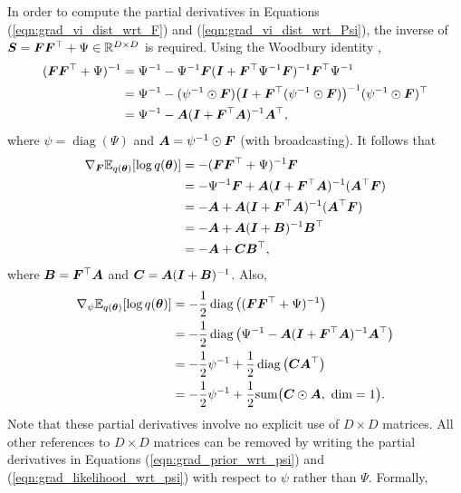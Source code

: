 \documentclass[10pt]{article} %
\newcommand{\diag}{\mathop{\mathrm{diag}}}
\begin{document}
In order to compute the partial derivatives in Equations (\ref{eqn:grad_vi_dist_wrt_F}) and (\ref{eqn:grad_vi_dist_wrt_Psi}), the inverse of ${\bm{S}} = {\bm{F}} {\bm{F}}^{\top} + \Psi \in \mathbb{R}^{D \times D}$ is required. Using the Woodbury identity \cite{petersen2012},
\begin{align}
\begin{split}
	( {\bm{F}} {\bm{F}}^{\top} + \Psi)^{-1}
	& = \Psi^{-1} - \Psi^{-1}{\bm{F}}({\bm{I}} + {\bm{F}}^\top \Psi^{-1} {\bm{F}})^{-1} {\bm{F}}^\top \Psi^{-1} \\
	& = \Psi^{-1} - (\psi^{-1} \odot {\bm{F}}) \big({\bm{I}} + {\bm{F}}^\top (\psi^{-1} \odot {\bm{F}})\big)^{-1} (\psi^{-1} \odot {\bm{F}})^\top \\
	& = \Psi^{-1} - {\bm{A}} ({\bm{I}} + {\bm{F}}^\top {\bm{A}})^{-1} {\bm{A}}^\top,
\end{split}
\end{align}
where $\psi = \diag(\Psi)$ and ${\bm{A}} = \psi^{-1} \odot {\bm{F}}$ (with broadcasting). It follows that
\begin{align}
\begin{split}
	\nabla_{\bm{F}} \mathbb{E}_{q({\bm{\theta}})} [\log q({\bm{\theta}})]
	& = -( {\bm{F}} {\bm{F}}^{\top} + \Psi)^{-1}{\bm{F}} \\
	& = -\Psi^{-1} {\bm{F}}  + {\bm{A}}  ({\bm{I}} + {\bm{F}}^\top {\bm{A}})^{-1} ({\bm{A}}^\top {\bm{F}}) \\
	& = -{\bm{A}}  + {\bm{A}} ({\bm{I}} + {\bm{F}}^\top {\bm{A}})^{-1} ({\bm{A}}^\top {\bm{F}}) \\
	& = -{\bm{A}}  + {\bm{A}} ({\bm{I}} + {\bm{B}})^{-1} {\bm{B}}^\top \\
	& = -{\bm{A}}  + {\bm{C}} {\bm{B}}^\top,
\end{split}
\end{align}
where ${\bm{B}} = {\bm{F}}^\top {\bm{A}}$ and ${\bm{C}} = {\bm{A}} ({\bm{I}} + {\bm{B}})^{-1}$. Also,
\begin{align}
\begin{split}
	\nabla_\psi \E_{q(\vtheta)} [\log q(\vtheta)]
	& = -\frac{1}{2} \diag\big( ( \mF \mF^{\top} + \Psi)^{-1}\big) \\
	& = -\frac{1}{2}\diag\big(\Psi^{-1}  - \mA  (\mI + \mF^\top \mA)^{-1} \mA^\top \big) \\
	& = -\frac{1}{2}\psi^{-1} + \frac{1}{2} \diag\big(\mC \mA^\top \big) \\
	& = -\frac{1}{2}\psi^{-1} + \frac{1}{2} \text{sum}\big(\mC \odot \mA, \text{ dim} = 1\big).
\end{split}
\end{align}
Note that these partial derivatives involve no explicit use of $D \times D$ matrices. All other references to $D \times D$ matrices can be removed by writing the partial derivatives in Equations (\ref{eqn:grad_prior_wrt_psi}) and (\ref{eqn:grad_likelihood_wrt_psi}) with respect to $\psi$ rather than $\Psi$. Formally,
\end{document}

